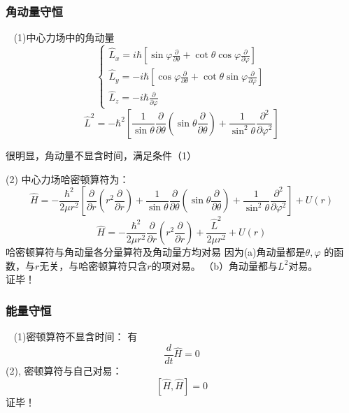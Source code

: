 \begin{frame}
    \frametitle{角动量守恒} 
    \例[5.试证明在中心力场中运动粒子的角动量是守恒量]{}                                
    \证~ (1)中心力场中的角动量
    $$
    \left\{\begin{array}{l}
        \hat{L}_{x}=i \hbar\left[\sin \varphi \frac{\partial}{\partial \theta}+\cot \theta \cos \varphi \frac{\partial}{\partial \varphi}\right] \\
        \hat{L}_{y}=-i \hbar\left[\cos \varphi \frac{\partial}{\partial \theta}+\cot \theta \sin \varphi \frac{\partial}{\partial \varphi}\right] \\
        \hat{L}_{z}=-i \hbar \frac{\partial}{\partial \varphi}
        \end{array}\right.
    $$
    $$ \hat{L}^{2}=-\hbar^{2}\left[\frac{1}{\sin \theta} \frac{\partial}{\partial \theta}\left(\sin \theta \frac{\partial}{\partial \theta}\right)+\frac{1}{\sin ^{2} \theta} \frac{\partial^{2}}{\partial \varphi^{2}}\right] $$
    
    很明显，角动量不显含时间，满足条件（1）\\
\end{frame}

\begin{frame} 
    (2) 中心力场哈密顿算符为： 
    $$
    \hat{H}=-\frac{\hbar^{2}}{2 \mu r^{2}}\left[\frac{\partial}{\partial r}\left(r^{2} \frac{\partial}{\partial r}\right)+\frac{1}{\sin \theta} \frac{\partial}{\partial \theta}\left(\sin \theta \frac{\partial}{\partial \theta}\right)+\frac{1}{\sin ^{2} \theta} \frac{\partial^{2}}{\partial \varphi^{2}}\right]+U(r)
    $$
    $$
    \hat{H}=-\frac{\hbar^{2}}{2 \mu r^{2}} \frac{\partial}{\partial r}\left(r^{2} \frac{\partial}{\partial r}\right)+\frac{\hat{L}^{2}}{2 \mu r^{2}}+U(r)
    $$
    哈密顿算符与角动量各分量算符及角动量方均对易 因为(a)角动量都是$\theta, \varphi$ 的函数，与$r$无关，与哈密顿算符只含$r$的项对易。
    （b）角动量都与$L^2$对易。\\
    证毕！
\end{frame}

\begin{frame} 
    \frametitle{能量守恒} 
    \例[6.试证明哈密顿算符不显含时间的体系能量守恒]{}                               
    \证~ (1)密顿算符不显含时间：
    有 $$\frac{d}{dt}\hat{H}=0$$ 
    (2), 密顿算符与自己对易： 
        $$ [\hat{H},\hat{H}]=0 $$
    证毕！
\end{frame}

